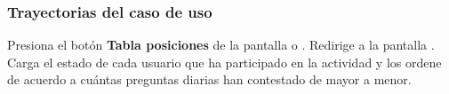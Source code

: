 \subsubsection{Trayectorias del caso de uso}

\begin{UCtrayectoria}%
%
    \Actor Presiona el botón {\bf Tabla posiciones} de la pantalla  o .
    \Sistema Redirige a la pantalla .
    \Sistema Carga el estado de cada usuario que ha participado en la actividad y los ordene de acuerdo a cuántas preguntas diarias han contestado de mayor a menor.

\end{UCtrayectoria}
